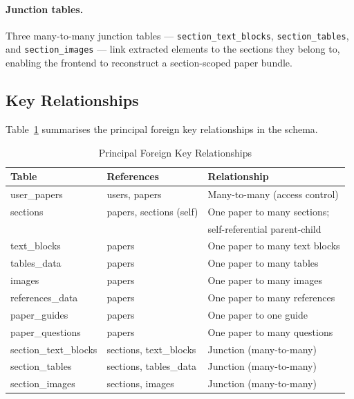 \documentclass[12pt,a4paper]{report}
\begin{document}
\paragraph{Junction tables.}
Three many-to-many junction tables — \texttt{section\_text\_blocks},
\texttt{section\_tables}, and \texttt{section\_images} — link extracted
elements to the sections they belong to, enabling the frontend to reconstruct
a section-scoped paper bundle.

\subsection{Key Relationships}

Table~\ref{tab:relationships} summarises the principal foreign key
relationships in the schema.

\begin{table}[h]
\centering
\begin{tabular}{|l|l|l|}
\hline
\textbf{Table} & \textbf{References} & \textbf{Relationship} \\
\hline
user\_papers & users, papers & Many-to-many (access control) \\
\hline
sections & papers, sections (self) & One paper to many sections; \\
 & & self-referential parent-child \\
\hline
text\_blocks & papers & One paper to many text blocks \\
\hline
tables\_data & papers & One paper to many tables \\
\hline
images & papers & One paper to many images \\
\hline
references\_data & papers & One paper to many references \\
\hline
paper\_guides & papers & One paper to one guide \\
\hline
paper\_questions & papers & One paper to many questions \\
\hline
section\_text\_blocks & sections, text\_blocks & Junction (many-to-many) \\
\hline
section\_tables & sections, tables\_data & Junction (many-to-many) \\
\hline
section\_images & sections, images & Junction (many-to-many) \\
\hline
\end{tabular}
\caption{Principal Foreign Key Relationships}
\label{tab:relationships}
\end{table}

\end{document}
